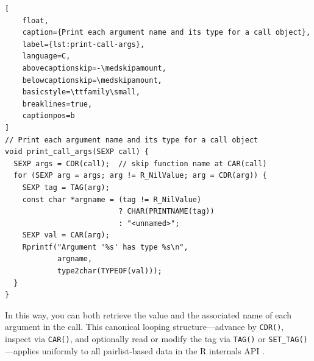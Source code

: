 \begin{lstlisting}[
    float,
    caption={Print each argument name and its type for a call object},
    label={lst:print-call-args},
    language=C,
    abovecaptionskip=-\medskipamount,
    belowcaptionskip=\medskipamount,
    basicstyle=\ttfamily\small,
    breaklines=true,
    captionpos=b
]
// Print each argument name and its type for a call object
void print_call_args(SEXP call) {
  SEXP args = CDR(call);  // skip function name at CAR(call)
  for (SEXP arg = args; arg != R_NilValue; arg = CDR(arg)) {
    SEXP tag = TAG(arg);
    const char *argname = (tag != R_NilValue)
                          ? CHAR(PRINTNAME(tag))
                          : "<unnamed>";
    SEXP val = CAR(arg);
    Rprintf("Argument '%s' has type %s\n",
            argname,
            type2char(TYPEOF(val)));
  }
}
\end{lstlisting}

In this way, you can both retrieve the value and the associated name of each argument in the call.  This canonical looping structure—advance by \texttt{CDR()}, inspect via \texttt{CAR()}, and optionally read or modify the tag via \texttt{TAG()} or \texttt{SET\_TAG()}—applies uniformly to all pairlist‐based data in the R internals API \cite{wickham_pairlists}.
